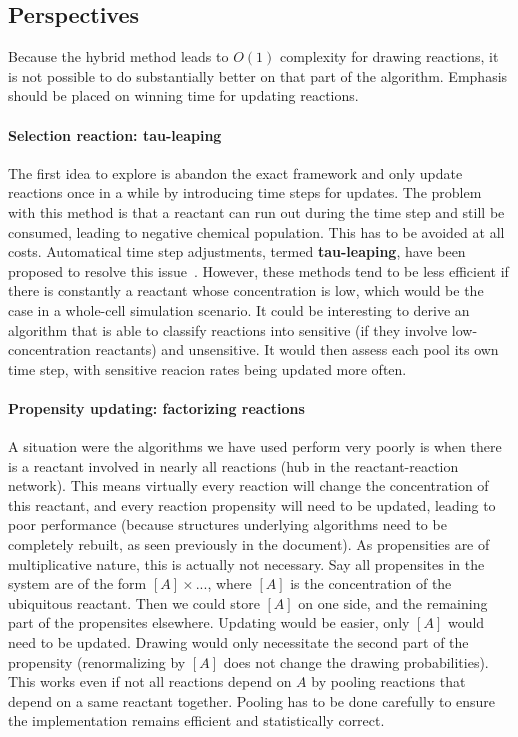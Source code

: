 \subsection {Perspectives}

Because the hybrid method leads to $O(1)$ complexity for drawing reactions, it is not possible to do substantially better on that part of the algorithm. Emphasis should be placed on winning time for updating reactions.

\paragraph{Selection reaction: tau-leaping} The first idea to explore is abandon the exact framework and only update reactions once in a while by introducing time steps for updates. The problem with this method is that a reactant can run out during the time step and still be consumed, leading to negative chemical population. This has to be avoided at all costs. Automatical time step adjustments, termed \textbf{tau-leaping}, have been proposed to resolve this issue~\citep{cao_avoiding_2005}. However, these methods tend to be less efficient if there is constantly a reactant whose concentration is low, which would be the case in a whole-cell simulation scenario. It could be interesting to derive an algorithm that is able to classify reactions into sensitive (if they involve low-concentration reactants) and unsensitive. It would then assess each pool its own time step, with sensitive reacion rates being updated more often.

\paragraph{Propensity updating: factorizing reactions} A situation were the algorithms we have used perform very poorly is when there is a reactant involved in nearly all reactions (hub in the reactant-reaction network). This means virtually every reaction will change the concentration of this reactant, and every reaction propensity will need to be updated, leading to poor performance (because structures underlying algorithms need to be completely rebuilt, as seen previously in the document). As propensities are of multiplicative nature, this is actually not necessary. Say all propensites in the system are of the form $[A]\times ...$, where $[A]$ is the concentration of the ubiquitous reactant. Then we could store $[A]$ on one side, and the remaining part of the propensites elsewhere. Updating would be easier, only $[A]$ would need to be updated. Drawing would only necessitate the second part of the propensity (renormalizing by $[A]$ does not change the drawing probabilities). This works even if not all reactions depend on $A$ by pooling reactions that depend on a same reactant together. Pooling has to be done carefully to ensure the implementation remains efficient and statistically correct.

